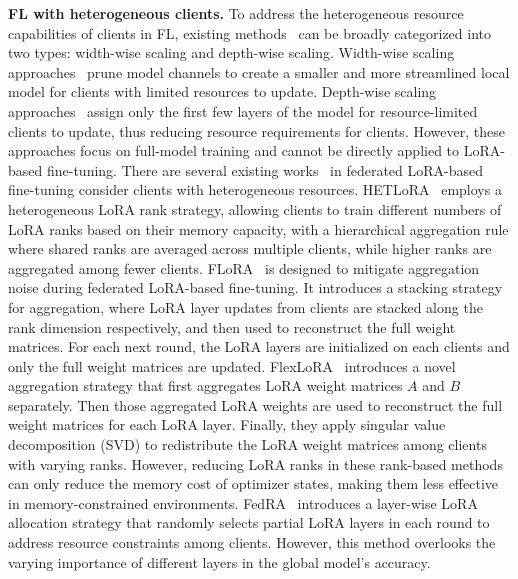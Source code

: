\documentclass[lettersize,journal]{IEEEtran}
\begin{document}
{\textbf{FL with heterogeneous clients.}
To address the heterogeneous resource capabilities of clients in FL, existing methods~\cite{diao2020heterofl,horvath2021fjord,kim2022depthfl,liu2022no} can be broadly categorized into two types: width-wise scaling and depth-wise scaling. Width-wise scaling approaches~\cite{diao2020heterofl, horvath2021fjord} prune model channels to create a smaller and more streamlined local model for clients with limited resources to update. Depth-wise scaling approaches~\cite{kim2022depthfl, liu2022no} assign only the first few layers of the model for resource-limited clients to update, thus reducing resource requirements for clients. However, these approaches focus on full-model training and cannot be directly applied to LoRA-based fine-tuning.
There are several existing works~\cite{cho2023heterogeneous,wang2024flora,bai2024flexlora,su2023fedra,zhang2024fed} in federated LoRA-based fine-tuning consider clients with heterogeneous resources. 
HETLoRA~\cite{cho2023heterogeneous} employs a heterogeneous LoRA rank strategy, allowing clients to train different numbers of LoRA ranks based on their memory capacity, with a hierarchical aggregation rule where shared ranks are averaged across multiple clients, while higher ranks are aggregated among fewer clients.
FLoRA~\cite{wang2024flora} is designed to mitigate aggregation noise during federated LoRA-based fine-tuning. It introduces a stacking strategy for aggregation, where LoRA layer updates from clients are stacked along the rank dimension respectively, and then used to reconstruct the full weight matrices. For each next round, the LoRA layers are initialized on each clients and only the full weight matrices are updated.
FlexLoRA~\cite{bai2024flexlora} introduces a novel aggregation strategy that first aggregates LoRA weight matrices $A$ and $B$ separately. Then those aggregated LoRA weights are used to reconstruct the full weight matrices for each LoRA layer. Finally, they 
apply singular value decomposition (SVD) to redistribute the LoRA weight matrices among clients with varying ranks.
However, reducing LoRA ranks in these rank-based methods can only reduce the memory cost of optimizer states, making them less effective in memory-constrained environments.
FedRA~\cite{su2023fedra} introduces a layer-wise LoRA allocation strategy that randomly selects partial LoRA layers in each round to address resource constraints among clients. However, this method overlooks the varying importance of different layers in the global model’s accuracy.}
\end{document}
